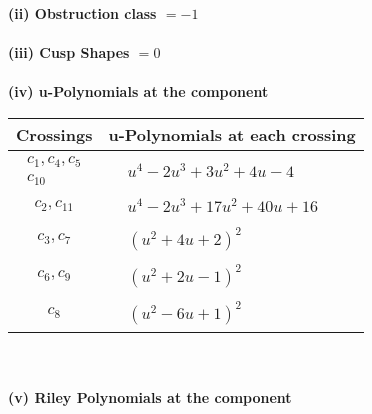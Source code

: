 \documentclass[1p]{elsarticle_modified}
\theoremstyle{definition}
\begin{document}
\flushleft \textbf{(ii) Obstruction class $= -1$}\\~\\
\flushleft \textbf{(iii) Cusp Shapes $= 0$}\\~\\
\newpage\renewcommand{\arraystretch}{1}
\flushleft \textbf{(iv) u-Polynomials at the component}\newline \\
\begin{tabular}{m{50pt}|m{274pt}}
Crossings & \hspace{64pt}u-Polynomials at each crossing \\
\hline $$\begin{aligned}c_{1},c_{4},c_{5}\\c_{10}\end{aligned}$$&$\begin{aligned}
&u^4-2 u^3+3 u^2+4 u-4
\end{aligned}$\\
\hline $$\begin{aligned}c_{2},c_{11}\end{aligned}$$&$\begin{aligned}
&u^4-2 u^3+17 u^2+40 u+16
\end{aligned}$\\
\hline $$\begin{aligned}c_{3},c_{7}\end{aligned}$$&$\begin{aligned}
&(u^2+4 u+2)^2
\end{aligned}$\\
\hline $$\begin{aligned}c_{6},c_{9}\end{aligned}$$&$\begin{aligned}
&(u^2+2 u-1)^2
\end{aligned}$\\
\hline $$\begin{aligned}c_{8}\end{aligned}$$&$\begin{aligned}
&(u^2-6 u+1)^2
\end{aligned}$\\
\hline
\end{tabular}\\~\\
\newpage\renewcommand{\arraystretch}{1}
\flushleft \textbf{(v) Riley Polynomials at the component}\newline \\
\end{document}
